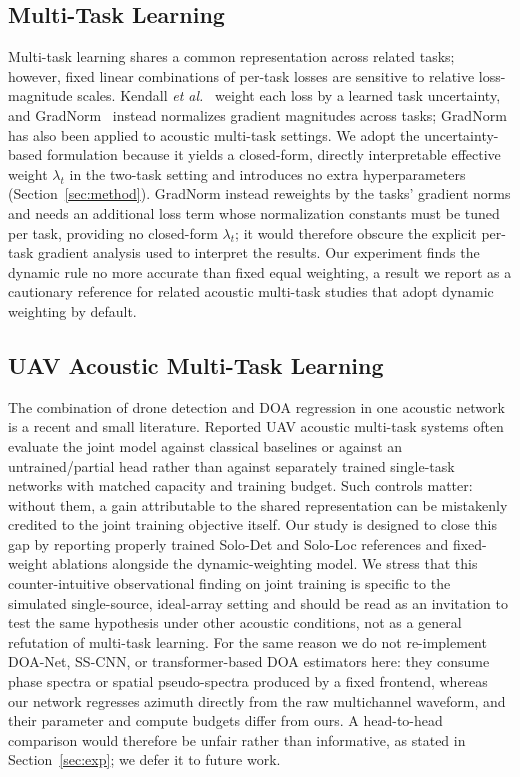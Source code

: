 \documentclass[sensors,article,submit,pdftex,moreauthors]{Definitions/mdpi}
\begin{document}
\subsection{Multi-Task Learning}
Multi-task learning shares a common representation across related tasks; however, fixed linear combinations of per-task losses are sensitive to relative loss-magnitude scales. Kendall \emph{et al.}~\cite{kendall2018mtl} weight each loss by a learned task uncertainty, and GradNorm~\cite{chen2018gradnorm} instead normalizes gradient magnitudes across tasks; GradNorm has also been applied to acoustic multi-task settings. We adopt the uncertainty-based formulation because it yields a closed-form, directly interpretable effective weight $\lambda_t$ in the two-task setting and introduces no extra hyperparameters (Section~\ref{sec:method}). GradNorm instead reweights by the tasks' gradient norms and needs an additional loss term whose normalization constants must be tuned per task, providing no closed-form $\lambda_t$; it would therefore obscure the explicit per-task gradient analysis used to interpret the results. Our experiment finds the dynamic rule no more accurate than fixed equal weighting, a result we report as a cautionary reference for related acoustic multi-task studies that adopt dynamic weighting by default.

\subsection{UAV Acoustic Multi-Task Learning}
The combination of drone detection and DOA regression in one acoustic network is a recent and small literature. Reported UAV acoustic multi-task systems often evaluate the joint model against classical baselines or against an untrained/partial head rather than against separately trained single-task networks with matched capacity and training budget. Such controls matter: without them, a gain attributable to the shared representation can be mistakenly credited to the joint training objective itself. Our study is designed to close this gap by reporting properly trained Solo-Det and Solo-Loc references and fixed-weight ablations alongside the dynamic-weighting model. We stress that this counter-intuitive observational finding on joint training is specific to the simulated single-source, ideal-array setting and should be read as an invitation to test the same hypothesis under other acoustic conditions, not as a general refutation of multi-task learning. For the same reason we do not re-implement DOA-Net, SS-CNN, or transformer-based DOA estimators here: they consume phase spectra or spatial pseudo-spectra produced by a fixed frontend, whereas our network regresses azimuth directly from the raw multichannel waveform, and their parameter and compute budgets differ from ours. A head-to-head comparison would therefore be unfair rather than informative, as stated in Section~\ref{sec:exp}; we defer it to future work.
\end{document}
